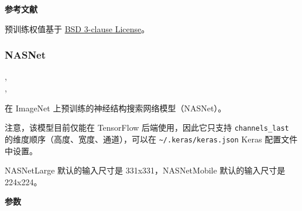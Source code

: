 \textbf{参考文献}\label{ux53c2ux8003ux6587ux732e-7}

预训练权值基于
\href{https://github.com/liuzhuang13/DenseNet/blob/master/LICENSE}{BSD
3-clause License}。



\subsubsection{NASNet}\label{nasnet}

\begin{Shaded}
\begin{Highlighting}[]
\OperatorTok{=}\OperatorTok{=}, \\
\hspace{3cm}\OperatorTok{=}\OperatorTok{=}\OperatorTok{=}\OperatorTok{=}\NormalTok{)}
\OperatorTok{=}\OperatorTok{=}, \\
\hspace{3cm}\OperatorTok{=}\OperatorTok{=}\OperatorTok{=}\OperatorTok{=}\NormalTok{)}
\end{Highlighting}
\end{Shaded}

在 ImageNet 上预训练的神经结构搜索网络模型（NASNet）。

注意，该模型目前仅能在 TensorFlow 后端使用，因此它只支持
\texttt{channels\_last} 的维度顺序（高度、宽度、通道），可以在
\texttt{\textasciitilde{}/.keras/keras.json} Keras 配置文件中设置。

NASNetLarge 默认的输入尺寸是 331x331，NASNetMobile 默认的输入尺寸是
224x224。

\textbf{参数}\label{ux53c2ux6570-8}


